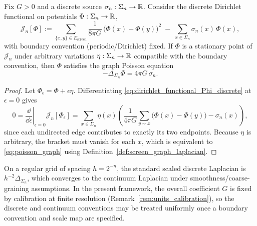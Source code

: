 \begin{proposition}
\label{prop:dirichlet_poisson_discrete}
Fix $G>0$ and a discrete source $\sigma_n:\Sigma_n\to\mathbb{R}$.
Consider the discrete Dirichlet functional on potentials $\Phi:\Sigma_n\to\mathbb{R}$,
\begin{equation}
\label{eq:dirichlet_functional_Phi_discrete}
\mathcal{J}_n[\Phi]
:=
\sum_{\{x,y\}\in E_{\mathrm{screen}}}\frac{1}{8\pi G}\,\bigl(\Phi(x)-\Phi(y)\bigr)^2
\;-\;
\sum_{x\in\Sigma_n}\sigma_n(x)\,\Phi(x),
\end{equation}
with boundary convention (periodic/Dirichlet) fixed.
If $\Phi$ is a stationary point of $\mathcal{J}_n$ under arbitrary variations $\eta:\Sigma_n\to\mathbb{R}$ compatible with the boundary convention, then $\Phi$ satisfies the graph Poisson equation
\begin{equation}
\label{eq:poisson_graph}
-\Delta_{\Sigma_n}\Phi=4\pi G\,\sigma_n.
\end{equation}
\end{proposition}

\begin{proof}
Let $\Phi_\epsilon=\Phi+\epsilon\eta$.
Differentiating \eqref{eq:dirichlet_functional_Phi_discrete} at $\epsilon=0$ gives
\[
0=\left.\frac{\dd}{\dd\epsilon}\right|_{\epsilon=0}\mathcal{J}_n[\Phi_\epsilon]
=\sum_{x\in\Sigma_n}\eta(x)\left(\frac{1}{4\pi G}\sum_{y\sim x}\bigl(\Phi(x)-\Phi(y)\bigr)-\sigma_n(x)\right),
\]
since each undirected edge contributes to exactly its two endpoints.
Because $\eta$ is arbitrary, the bracket must vanish for each $x$, which is equivalent to \eqref{eq:poisson_graph} using Definition~\ref{def:screen_graph_laplacian}.
\end{proof}

\begin{remark}
\label{rem:poisson_discrete_to_continuum}
On a regular grid of spacing $h=2^{-n}$, the standard scaled discrete Laplacian is $h^{-2}\Delta_{\Sigma_n}$, which converges to the continuum Laplacian under smoothness/coarse-graining assumptions.
In the present framework, the overall coefficient $G$ is fixed by calibration at finite resolution (Remark~\ref{rem:units_calibration}), so the discrete and continuum conventions may be treated uniformly once a boundary convention and scale map are specified.
\end{remark}

